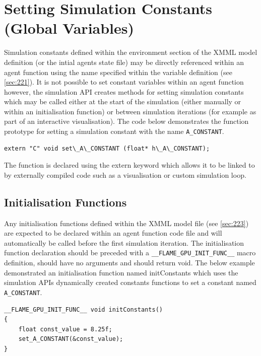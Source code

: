 \documentclass[11pt, a4paper, onecolumn, oneside]{report}
\begin{document}
\section{Setting Simulation Constants (Global Variables)}
\label{sec:39}


Simulation constants defined within the environment section of the XMML model definition (or the intial agents state file) may be directly referenced within an agent function using the name specified within the variable definition (see \cref{sec:221}).
It is not possible to set constant variables within an agent function however, the simulation API creates methods for setting simulation constants which may be called either at the start of the simulation (either manually or within an initialisation function) or between simulation iterations (for example as part of an interactive visualisation).
The code below demonstrates the function prototype for setting a simulation constant with the name \texttt{A_CONSTANT}.


\begin{verbatim}
extern "C" void set\_A\_CONSTANT (float* h\_A\_CONSTANT);
\end{verbatim}

The function is declared using the extern keyword which allows it to be linked to by externally compiled code such as a visualisation or custom simulation loop.

\subsection{Initialisation Functions}
\label{sec:391}


Any initialisation functions defined within the XMML model file (see \cref{sec:223}) are expected to be declared within an agent function code file and will automatically be called before the first simulation iteration.
The initialisation function declaration should be preceded with a \texttt{__FLAME_GPU_INIT_FUNC__} macro definition, should have no arguments and should return void.
The below example demonstrated an initialisation function named initConstants which uses the simulation APIs dynamically created constants functions to set a constant named \texttt{A_CONSTANT}. 

\begin{verbatim}
__FLAME_GPU_INIT_FUNC__ void initConstants()
{
    float const_value = 8.25f;
    set_A_CONSTANT(&const_value);
}
\end{verbatim}
\end{document}
